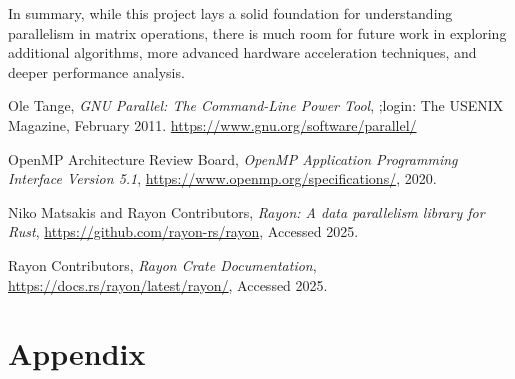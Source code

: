 \documentclass[12pt]{article}
\begin{document}
In summary, while this project lays a solid foundation for understanding parallelism in matrix operations, there is much room for future work in exploring
additional algorithms, more advanced hardware acceleration techniques, and deeper performance analysis.


\newpage
\begin{thebibliography}{9}

    Ole Tange, \textit{GNU Parallel: The Command-Line Power Tool}, ;login: The USENIX Magazine, February 2011. \url{https://www.gnu.org/software/parallel/}

    OpenMP Architecture Review Board, \textit{OpenMP Application Programming Interface Version 5.1},
    \url{https://www.openmp.org/specifications/}, 2020.

    Niko Matsakis and Rayon Contributors, \textit{Rayon: A data parallelism library for Rust},
    \url{https://github.com/rayon-rs/rayon}, Accessed 2025.

    Rayon Contributors, \textit{Rayon Crate Documentation}, \url{https://docs.rs/rayon/latest/rayon/}, Accessed 2025.

\end{thebibliography}

\pagebreak

\section*{Appendix}
\end{document}
